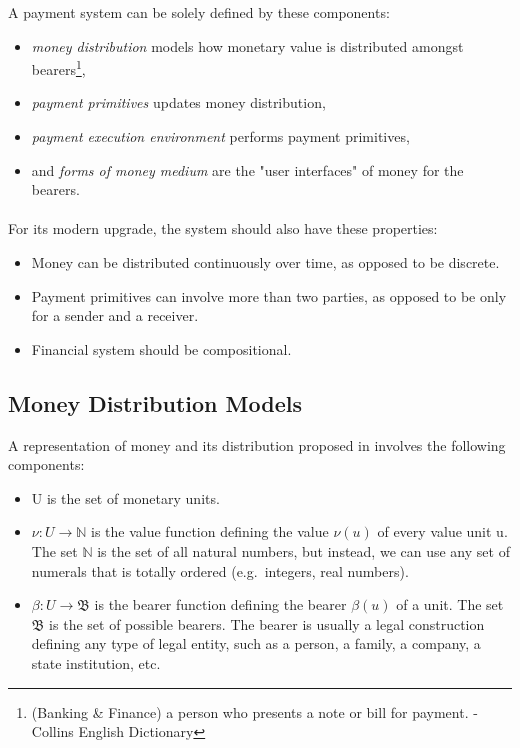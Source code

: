 \documentclass[a4paper,10pt]{report}
\begin{document}
A payment system can be solely defined by these components:

\begin{itemize}
\item \textit{money distribution} models how monetary value is distributed amongst bearers\footnote{(Banking \& Finance)
a person who presents a note or bill for payment. - Collins English Dictionary},
\item \textit{payment primitives} updates money distribution,
\item \textit{payment execution environment} performs payment primitives,
\item and \textit{forms of money medium} are the "user interfaces" of money for the bearers.
\end{itemize}

\paragraph{}

For its modern upgrade, the system should also have these properties:

\begin{itemize}
\item Money can be distributed continuously over time, as opposed to be discrete.
\item Payment primitives can involve more than two parties, as opposed to be only for a sender and a receiver.
\item Financial system should be compositional.
\end{itemize}


\subsection{Money Distribution Models}

A representation of money and its distribution proposed in \cite{buldas2021unifying} involves the following components:

\begin{itemize}
\item U is the set of monetary units.
\item $\nu : U \rightarrow \mathbb{N}$ is the value function defining the value $\nu(u)$ of every value unit u. The set
    $\mathbb{N}$ is the set of all natural numbers, but instead, we can use any set of numerals that is totally ordered
    (e.g.\ integers, real numbers).
\item $\beta : U \rightarrow \mathfrak{B}$ is the bearer function defining the bearer $\beta(u)$ of a unit. The set
    $\mathfrak{B}$ is the set of possible bearers. The bearer is usually a legal construction defining any type of legal
    entity, such as a person, a family, a company, a state institution, etc.
\end{itemize}
\end{document}
